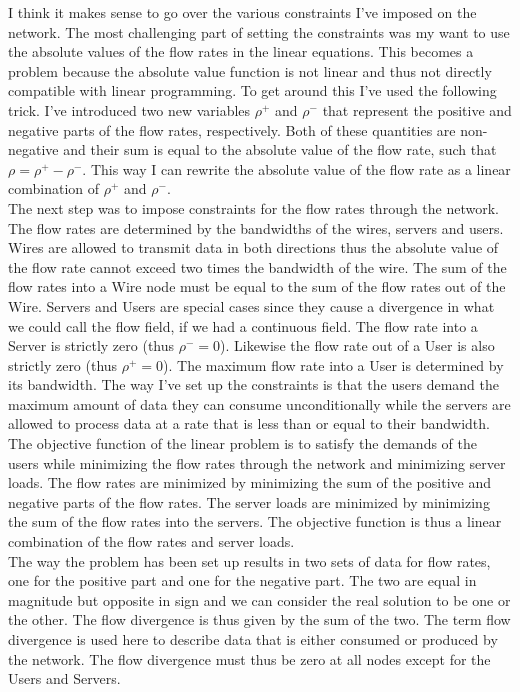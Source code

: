 \documentclass[10pt, titlepage, a4paper]{article}
\begin{document}
I think it makes sense to go over the various constraints I've imposed on the network. The most challenging part of setting 
the constraints was my want to use the absolute values of the flow rates in the linear equations. This becomes a problem 
because the absolute value function is not linear and thus not directly compatible with linear programming. To get around 
this I've used the following trick. I've introduced two new variables $\rho^+$ and $\rho^-$ that represent the positive and
negative parts of the flow rates, respectively. Both of these quantities are non-negative and their sum is equal to the
absolute value of the flow rate, such that $\rho = \rho^+ - \rho^-$. This way I can rewrite the absolute value of the flow rate
as a linear combination of $\rho^+$ and $\rho^-$. \\ 

The next step was to impose constraints for the flow rates through the 
network. The flow rates are determined by the bandwidths of the wires, servers and users. Wires are allowed to transmit 
data in both directions thus the absolute value of the flow rate cannot exceed two times the bandwidth of the wire. The sum 
of the flow rates into a Wire node must be equal to the sum of the flow rates out of the Wire. Servers and Users are special 
cases since they cause a divergence in what we could call the flow field, if we had a continuous field. The flow rate into a
Server is strictly zero (thus $\rho^- = 0$). Likewise the flow rate out of a User is also strictly zero (thus $\rho^+ = 0$). The maximum flow
rate into a User is determined by its bandwidth. The way I've set up the constraints is that the users demand the 
maximum amount of data they can consume unconditionally while the servers are allowed to process data at
a rate that is less than or equal to their bandwidth. \\

The objective function of the linear problem is to satisfy the demands of the users while minimizing the flow rates 
through the network and minimizing server loads. The flow rates are minimized by minimizing the sum of the positive and
negative parts of the flow rates. The server loads are minimized by minimizing the sum of the flow rates into the servers.
The objective function is thus a linear combination of the flow rates and server loads. \\

The way the problem has been set up results in two sets of data for flow rates, one for the positive part and
one for the negative part. The two are equal in magnitude but opposite in sign and we can consider the real 
solution to be one or the other. The flow divergence is thus given by the sum of the two. The term flow 
divergence is used here to describe data that is either consumed or produced by the network. The flow divergence
must thus be zero at all nodes except for the Users and Servers. \\
\end{document}
